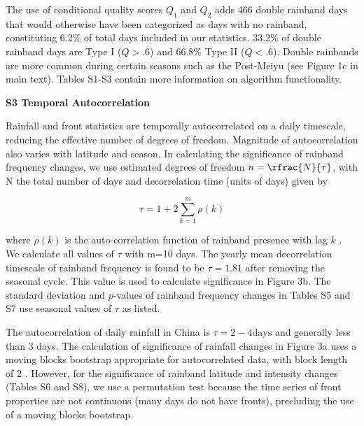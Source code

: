 \documentclass[final,grl]{agutexSI}
\begin{document}
\begin{article}
\vspace{1mm}

	The use of conditional quality scores $Q_1$ and $Q_2$ adds 466 double rainband days that would otherwise have been categorized as days with no rainband, constituting 6.2\% of total days included in our statistics. 33.2\% of double rainband days are Type I ($Q>.6$) and 66.8\% Type II ($Q<.6$). Double rainbands are more common during certain seasons such as the Post-Meiyu (see Figure 1c in main text). Tables S1-S3 contain more information on algorithm functionality.
	
\vspace{5mm}

\noindent\textbf{{\Large S3 Temporal Autocorrelation}}

\vspace{2mm}

Rainfall and front statistics are temporally autocorrelated on a daily timescale, reducing the effective number of degrees of freedom. Magnitude of autocorrelation also varies with latitude and season. In calculating the significance of rainband frequency changes, we use estimated degrees of freedom $n=\rfrac{N}{\tau}$, with N the total number of days and decorrelation time \tau (units of days) given by

\begin{equation*}
\tau=1+2\sum_{k=1}^m \rho(k)
\end{equation*}

where $\rho(k)$ is the auto-correlation function of rainband presence with lag $k$ \citep{Livezey,von Storch}. We calculate all values of $\tau$ with m=10 days. The yearly mean decorrelation timescale of rainband frequency is found to be $\tau = 1.81$ after removing the seasonal cycle. This value is used to calculate significance in Figure 3b. The standard deviation and $p$-values of rainband frequency changes in Tables S5 and S7 use seasonal values of $\tau$ as listed.

The autocorrelation of daily rainfall in China is $\tau =2-4 \mathrm{days}$ and generally less than 3 days. The calculation of significance of rainfall changes in Figure 3a uses a moving blocks bootstrap appropriate for autocorrelated data, with block length of 2 \citep{Singh2014}. However, for the significance of rainband latitude and intensity changes (Tables S6 and S8), we use a permutation test because the time series of front properties are not continuous (many days do not have fronts), precluding the use of a moving blocks bootstrap.


\end{article}
\end{document}
